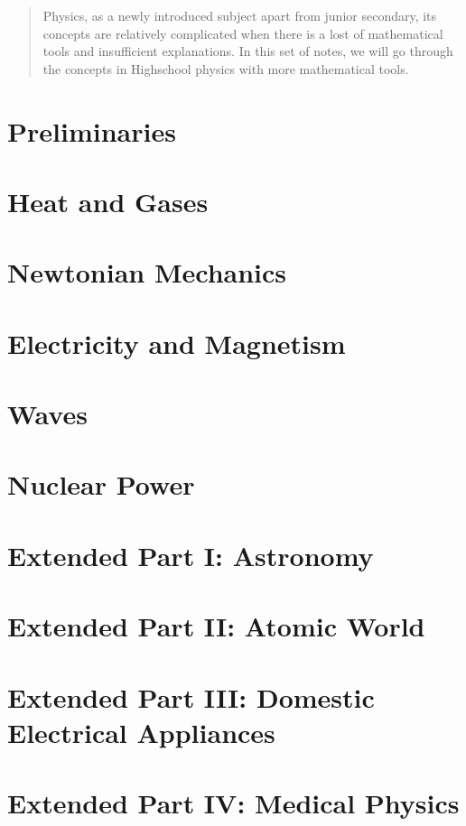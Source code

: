 \documentclass[12pt]{article}
\begin{document}
    \begin{abstract}
        Physics, as a newly introduced subject apart from junior secondary, its concepts are relatively complicated when there is a lost of mathematical tools and insufficient explanations. In this set of notes, we will go through the concepts in Highschool physics with more mathematical tools.
    \end{abstract}

    \tableofcontents

    \section{Preliminaries}

    \section{Heat and Gases}

    \section{Newtonian Mechanics}

    \section{Electricity and Magnetism}

    \section{Waves}

    \section{Nuclear Power}

    \section{Extended Part I: Astronomy}

    \section{Extended Part II: Atomic World}

    \section{Extended Part III: Domestic Electrical Appliances}

    \section{Extended Part IV: Medical Physics}
\end{document}
